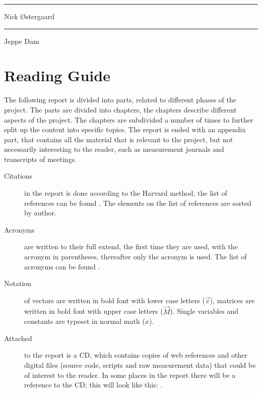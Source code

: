 \begin{center}
  \begin{minipage}[t]{0.47\textwidth}
    \centering \vspace{1.5cm} \hrule \vspace{1mm} Nick \O stergaard
  \end{minipage}
  \hfill
  \begin{minipage}[t]{0.47\textwidth}
    \centering \vspace{1.5cm} \hrule \vspace{1mm} Jeppe Dam
  \end{minipage}
\end{center}


\newpage
\section*{Reading Guide}
The following report is divided into parts, related to different phases of the project. The parts are divided into chapters, the chapters describe different aspects of the project. The chapters are subdivided a number of times to further split up the content into specific topics. The report is ended with an appendix part, that contains all the material that is relevant to the project, but not necessarily interesting to the reader, such as measurement journals and transcripts of meetings.

\begin{description}
\item[Citations] in the report is done according to the Harvard method, the list of references can be found . The elements on the list of references are sorted by author.
\item[Acronyms] are written to their full extend, the first time they are used, with the acronym in parentheses, thereafter only the acronym is used. The list of acronyms can be found .
\item[Notation] of vectors are written in bold font with lower case letters ($\vec{v}$), matrices are written in bold font with upper case letters ($\vec{M}$). Single variables and constants are typeset in normal math ($x$).
\item[Attached] to the report is a CD, which contains copies of web references and other digital files (source code, scripts and raw measurement data) that could be of interest to the reader. In some places in the report there will be a reference to the CD; this will look like this: .
\end{description}
